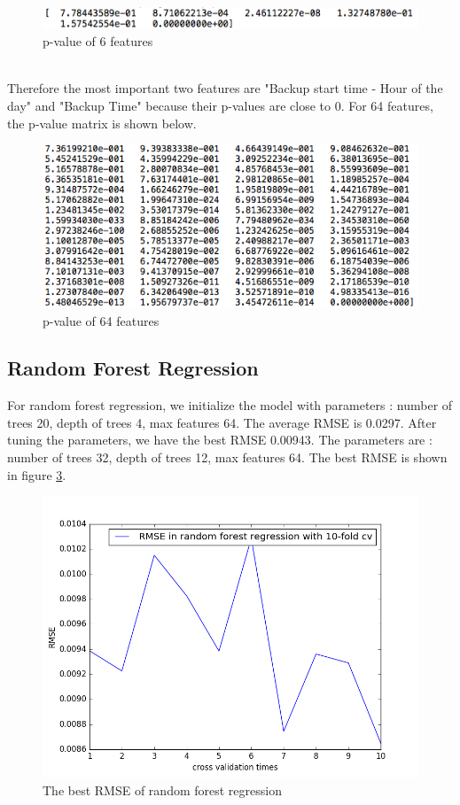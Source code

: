 \documentclass{article}
\begin{document}
\begin{figure}[htbp]
\centering
\includegraphics[width=.8\textwidth]{pvalue-6.png}
\caption{p-value of 6 features}
\label{fig:p6}
\end{figure}
\\
Therefore the most important two features are "Backup start time - Hour of the day" and "Backup Time" because their p-values are close to 0.
For 64 features, the p-value matrix is shown below.\\
\begin{figure}[htbp]
\centering
\includegraphics[width=.8\textwidth]{pvalue-64.png}
\caption{p-value of 64 features}
\label{fig:p64}
\end{figure}
\subsection{Random Forest Regression}
For random forest regression, we initialize the model with parameters : number of trees 20, depth of trees 4, max features 64. The average RMSE is 0.0297. After tuning the parameters, we have the best RMSE 0.00943. The parameters are : number of trees 32, depth of trees 12, max features 64. The best RMSE is shown in figure \ref{fig:rf}.\\
\begin{figure}[htbp]
\centering
\includegraphics[width=.6\textwidth]{rf_rmse.png}
\caption{The best RMSE of random forest regression}
\label{fig:rf}
\end{figure}
\end{document}
